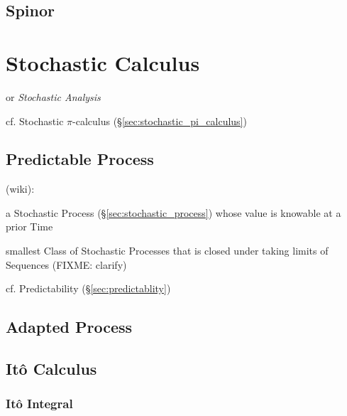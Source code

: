 \subsection{Spinor}\label{sec:spinor}



\section{Stochastic Calculus}\label{sec:stochastic_calculus}

or \emph{Stochastic Analysis}


cf. Stochastic $\pi$-calculus (\S\ref{sec:stochastic_pi_calculus})



\subsection{Predictable Process}\label{sec:predictable_process}

(wiki):

a Stochastic Process (\S\ref{sec:stochastic_process}) whose value is knowable at
a prior Time

smallest Class of Stochastic Processes that is closed under taking limits of
Sequences (FIXME: clarify)

cf. Predictability (\S\ref{sec:predictablity})



\subsection{Adapted Process}\label{sec:adapted_process}

\subsection{It\^o Calculus}\label{sec:ito_calculus}

\subsubsection{It\^o Integral}\label{sec:ito_integral}

